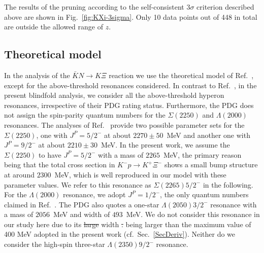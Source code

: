 \documentclass[10pt,aps,prc,superscriptaddress,twoside,twocolumn,nofootinbib,showpacs,preprintnumbers]{revtex4-1}
\newcommand{\cor}[2]{{\color{red} \sout{#1}} {\color{blue} #2}}
\begin{document}
The results of the pruning according to the self-consistent $3\sigma$ criterion described above are shown in Fig.~\ref{fig:KXi-3sigma}. Only 10 data points out of 448 in total are outside the allowed range of $z$.


\subsection{Theoretical model}
\label{subsec:KXi-Model}

In the analysis of the $\bar{K} N \to K \Xi$ reaction we use the theoretical model of Ref.~\cite{Jackson:2015dva}, except for the above-threshold resonances considered. In contrast to Ref.~\cite{Jackson:2015dva}, in the present blindfold analysis, we consider all the above-threshold hyperon resonances, irrespective of their PDG rating status. Furthermore, the PDG \cite{PDG16} does not assign the spin-parity quantum numbers for the $\Sigma(2250)$ and $\Lambda(2000)$ resonances. The analyses of Ref.~\cite{DeBellefon:1972gm}  provide two possible parameter sets for the $\Sigma(2250)$, one with $J^P = 5/2^-$ at about $2270 \pm 50$~MeV and another
one with $J^P = 9/2^-$ at about $2210 \pm 30$~MeV. In the present work, we assume the $\Sigma(2250)$ to have $J^P = 5/2^-$ with a mass of $2265$~MeV, the primary reason being that the total cross section in $K^-p\to K^+\Xi^-$ shows a small bump structure at around $2300$~MeV, which is well reproduced in our model with these parameter values. 
We refer to this resonance as $\Sigma(2265)5/2^-$ in the following.
For the $\Lambda(2000)$ resonance, we adopt $J^P=1/2^-$, the only  quantum numbers claimed in Ref.~\cite{Zhang:2013sva}. The PDG also quotes a one-star $\Lambda(2050)3/2^-$ resonance with a mass of $2056$~MeV and width of $493$~MeV.
We do not consider this resonance in our study here due to its \cor{large}{} width\cor{.}{ being larger than the maximum value of 400 MeV adopted in the present work (cf.~Sec.~\ref{SecDeriv}).} 
Neither do we consider the high-spin three-star $\Lambda(2350)9/2^-$ resonance. 
\end{document}
